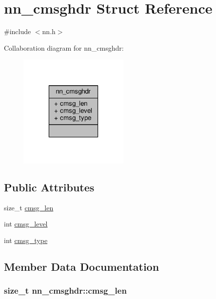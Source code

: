 \hypertarget{structnn__cmsghdr}{}\section{nn\+\_\+cmsghdr Struct Reference}
\label{structnn__cmsghdr}


{\ttfamily \#include $<$nn.\+h$>$}



Collaboration diagram for nn\+\_\+cmsghdr\+:\nopagebreak
\begin{figure}[H]
\begin{center}
\leavevmode
\includegraphics[width=154pt]{structnn__cmsghdr__coll__graph}
\end{center}
\end{figure}
\subsection*{Public Attributes}
\begin{DoxyCompactItemize}
\item 
size\+\_\+t \hyperlink{structnn__cmsghdr_a69be5db8bf0f6b68a7f8c9c10e8db839}{cmsg\+\_\+len}
\item 
int \hyperlink{structnn__cmsghdr_a032fd87fda6598a0038492a67f988588}{cmsg\+\_\+level}
\item 
int \hyperlink{structnn__cmsghdr_afdca1067604788429d246880beb07bff}{cmsg\+\_\+type}
\end{DoxyCompactItemize}


\subsection{Member Data Documentation}
\subsubsection[{cmsg\+\_\+len}]{\setlength{\rightskip}{0pt plus 5cm}size\+\_\+t nn\+\_\+cmsghdr\+::cmsg\+\_\+len}\hypertarget{structnn__cmsghdr_a69be5db8bf0f6b68a7f8c9c10e8db839}{}\label{structnn__cmsghdr_a69be5db8bf0f6b68a7f8c9c10e8db839}
